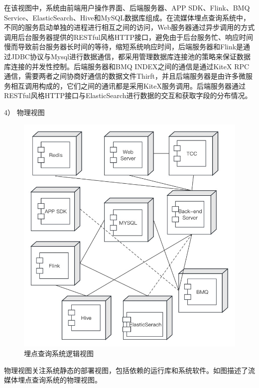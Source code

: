 在该视图中，系统由前端用户操作界面、后端服务器、APP SDK、Flink、BMQ Service、ElasticSearch、Hive和MySQL数据库组成。在流媒体埋点查询系统中，不同的服务启动单独的进程进行相互之间的访问，Web服务器通过异步调用的方式调用后台服务器提供的RESTful风格HTTP接口，避免由于后台服务忙、响应时间慢而导致前台服务器长时间的等待，缩短系统响应时间，后端服务器和Flink是通过JDBC协议与Mysql进行数据通信，都采用管理数据库连接池的策略来保证数据库连接的并发性控制。后端服务器和BMQ INDEX之间的通信是通过KiteX RPC通信，需要两者之间协商好通信的数据文件Thirft，并且后端服务器是由许多微服务相互调用构成的，它们之间的通讯都是采用KiteX服务调用。后端服务器通过RESTful风格HTTP接口与ElasticSearch进行数据的交互和获取字段的分布情况。

4）	物理视图

 \begin{figure}[htb]
  \centering
  \includegraphics[width=5in]{figure/chapter4/系统物理视图.jpg}
  \caption{埋点查询系统逻辑视图}\label{xitongwuli}
\end{figure}

物理视图关注系统静态的部署视图，包括依赖的运行库和系统软件。如图描述了流媒体埋点查询系统的物理视图。

